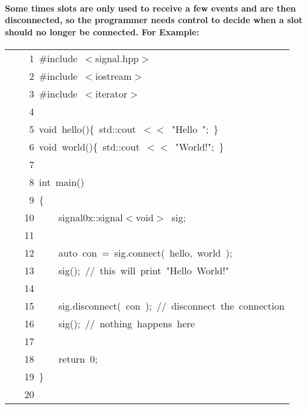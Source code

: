 \documentclass[9pt,onside,a4paper]{article}
\newcommand{\hlstd}[1]{\textcolor[rgb]{0.2,0,0.4}{#1}}
\newcommand{\hlnum}[1]{\textcolor[rgb]{0.2,0.73,0.02}{#1}}
\newcommand{\hlstr}[1]{\textcolor[rgb]{0.09,0.38,0.65}{#1}}
\newcommand{\hlslc}[1]{\textcolor[rgb]{0,0.4,0.2}{#1}}
\newcommand{\hlppc}[1]{\textcolor[rgb]{0.33,0.45,0.69}{#1}}
\newcommand{\hlopt}[1]{\textcolor[rgb]{0.33,0.33,0.33}{#1}}
\newcommand{\hllin}[1]{\textcolor[rgb]{0.6,0.6,0.6}{#1}}
\newcommand{\hlkwa}[1]{\textcolor[rgb]{1,0.19,0.19}{#1}}
\newcommand{\hlkwb}[1]{\textcolor[rgb]{0.96,0.55,0.14}{#1}}
\newcommand{\hlkwc}[1]{\textcolor[rgb]{0,0,1}{#1}}
\newcommand{\hlkwd}[1]{\textcolor[rgb]{0.82,0.11,0.93}{#1}}
\begin{document}
\paragraph{Some times slots are only used to receive a few events and are then disconnected, so the programmer needs control to decide
    when a slot should no longer be connected. For Example:}
\ttfamily
\begin{center}
\begin{xtabular}{||l||}
\hline
\hlstd{}\hllin{\ \ \ \ 1\ }\hlppc{\#include\ $<$signal.hpp$>$}\\
\hllin{\ \ \ \ 2\ }\hlstd{}\hlppc{\#include\ $<$iostream$>$}\\
\hllin{\ \ \ \ 3\ }\hlstd{}\hlppc{\#include\ $<$iterator$>$}\\
\hllin{\ \ \ \ 4\ }\hlstd{}\\
\hllin{\ \ \ \ 5\ }\hlkwb{void\ }\hlstd{}\hlkwd{hello}\hlstd{}\hlopt{()\{\ }\hlstd{std}\hlopt{::}\hlstd{cout\ }\hlopt{$<$$<$\ }\hlstd{}\hlstr{"Hello\ "}\hlstd{}\hlopt{;\ \}}\\
\hllin{\ \ \ \ 6\ }\hlstd{}\hlkwb{void\ }\hlstd{}\hlkwd{world}\hlstd{}\hlopt{()\{\ }\hlstd{std}\hlopt{::}\hlstd{cout\ }\hlopt{$<$$<$\ }\hlstd{}\hlstr{"World!"}\hlstd{}\hlopt{;\ \}}\\
\hllin{\ \ \ \ 7\ }\hlstd{}\\
\hllin{\ \ \ \ 8\ }\hlkwb{int\ }\hlstd{}\hlkwd{main}\hlstd{}\hlopt{()}\\
\hllin{\ \ \ \ 9\ }\hlstd{}\hlopt{\{}\\
\hllin{\ \ \ 10\ }\hlstd{}\hlstd{\ \ \ \ }\hlstd{signal0x}\hlopt{::}\hlstd{signal}\hlopt{$<$}\hlstd{}\hlkwb{void}\hlstd{}\hlopt{$>$\ }\hlstd{sig}\hlopt{;}\\
\hllin{\ \ \ 11\ }\hlstd{}\\
\hllin{\ \ \ 12\ }\hlstd{\ \ \ \ }\hlstd{}\hlkwc{auto\ }\hlstd{con\ }\hlopt{=\ }\hlstd{sig}\hlopt{.}\hlstd{}\hlkwd{connect}\hlstd{}\hlopt{(\ }\hlstd{hello}\hlopt{,\ }\hlstd{world\ }\hlopt{);}\\
\hllin{\ \ \ 13\ }\hlstd{}\hlstd{\ \ \ \ }\hlstd{}\hlkwd{sig}\hlstd{}\hlopt{();\ }\hlstd{}\hlslc{//\ this\ will\ print\ "Hello\ World!"}\\
\hllin{\ \ \ 14\ }\hlstd{}\\
\hllin{\ \ \ 15\ }\hlstd{\ \ \ \ }\hlstd{sig}\hlopt{.}\hlstd{}\hlkwd{disconnect}\hlstd{}\hlopt{(\ }\hlstd{con\ }\hlopt{);\ }\hlstd{}\hlslc{//\ disconnect\ the\ connection}\\
\hllin{\ \ \ 16\ }\hlstd{}\hlstd{\ \ \ \ }\hlstd{}\hlkwd{sig}\hlstd{}\hlopt{();\ }\hlstd{}\hlslc{//\ nothing\ happens\ here}\\
\hllin{\ \ \ 17\ }\hlstd{}\hlstd{\ \ \ \ \ \ \ \ }\hlstd{}\\
\hllin{\ \ \ 18\ }\hlstd{\ \ \ \ }\hlstd{}\hlkwa{return\ }\hlstd{}\hlnum{0}\hlstd{}\hlopt{;}\\
\hllin{\ \ \ 19\ }\hlstd{}\hlopt{\}}\\
\hllin{\ \ \ 20\ }\hlstd{}\\
\hline
\end{xtabular}
\end{center}
\normalfont
\normalsize
\end{document}
